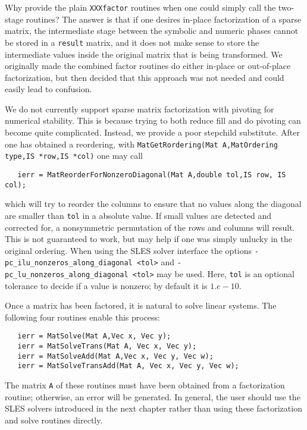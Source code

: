 Why provide the plain {\tt XXXfactor} routines when one could simply 
call the two-stage routines? The answer is that if one desires in-place 
factorization of a sparse matrix, the intermediate stage between the 
symbolic and numeric phases cannot be stored in a {\tt result} matrix, and
it does not make sense to store the intermediate values
inside the original matrix 
that is being transformed.  We originally made the combined factor routines
do either in-place or out-of-place factorization, but then decided that 
this approach was not needed and could easily lead to confusion.

We do not currently support sparse matrix factorization with pivoting
for numerical stability. This is because trying to both reduce fill
and do pivoting can become quite complicated. Instead, we provide a 
poor stepchild substitute. After one has obtained a reordering, with
{\tt MatGetRordering(Mat A,MatOrdering type,IS *row,IS *col)} one
may call
\begin{verbatim}
   ierr = MatReorderForNonzeroDiagonal(Mat A,double tol,IS row, IS col);
\end{verbatim}
which will try to reorder the columns to ensure that no values along 
the diagonal are smaller than {\tt tol} in a absolute value. If small 
values are detected and corrected for, a nonsymmetric
permutation of the rows and columns will result. This is not guaranteed to work, 
but may help if one was simply unlucky in the original ordering.
 When using the SLES solver interface
the options {\tt -pc\_ilu\_nonzeros\_along\_diagonal <tol>} 
and 
{\tt -pc\_lu\_nonzeros\_along\_diagonal <tol>} may be used.  Here, {\tt tol}
is an optional tolerance to decide if a value is nonzero; by default it
is $ 1.e-10.$ 

Once a matrix has been factored, it is natural to solve linear systems.
The following four routines enable this process:  
\begin{verbatim}
   ierr = MatSolve(Mat A,Vec x, Vec y);
   ierr = MatSolveTrans(Mat A, Vec x, Vec y);
   ierr = MatSolveAdd(Mat A,Vec x, Vec y, Vec w);
   ierr = MatSolveTransAdd(Mat A, Vec x, Vec y, Vec w);
\end{verbatim}
The  
matrix 
{\tt A} of these routines must have been obtained from a 
factorization routine; otherwise, an error will be generated.
In general, the user should use the SLES solvers introduced in the 
next chapter rather than using these factorization and solve routines
directly.

